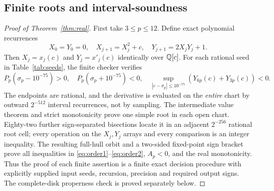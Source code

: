 \subsection{Finite roots and interval-soundness}
\begin{proof}[Proof of Theorem~\ref{thm:real}]
First take $3\le p\le12$.  Define exact polynomial recurrences
\[
 X_0=Y_0=0,\quad X_{j+1}=X_j^2+c,\quad
 Y_{j+1}=2X_jY_j+1.
\]
Then $X_j=x_j(c)$ and $Y_j=x'_j(c)$ identically
over $\mathbb Q[c]$.  For each rational seed in
Table~\ref{tab:seeds}, the finite checker verifies
\begin{equation}\label{eq:finite-sign}
 P_p(\sigma_p-10^{-75})>0,\quad
 P_p(\sigma_p+10^{-75})<0,\quad
 \sup_{|c-\sigma_p|\le10^{-75}}
 (Y_{6p}(c)+Y_{3p}(c))<0.
\end{equation}
The endpoints are rational, and the derivative is evaluated
on the \emph{entire} chart by outward $2^{-512}$
interval recurrences, not by sampling.  The intermediate
value theorem and strict monotonicity prove one simple root
in each open chart.  Eighty-two further sign-separated
bisections locate it in an adjacent $2^{-256}$
rational root cell; every operation on the $X_j,Y_j$
arrays and every comparison is an integer inequality.
The resulting full-hull orbit and a two-sided
fixed-point sign bracket prove all inequalities in
\eqref{eq:order1}--\eqref{eq:order2}, $A_p<0$, and the
real monotonicity.  Thus the proof of each finite assertion
is a finite exact decision procedure with explicitly supplied
input seeds, recursion, precision and required output signs.
The complete-disk properness check is proved separately below.


\end{proof}
